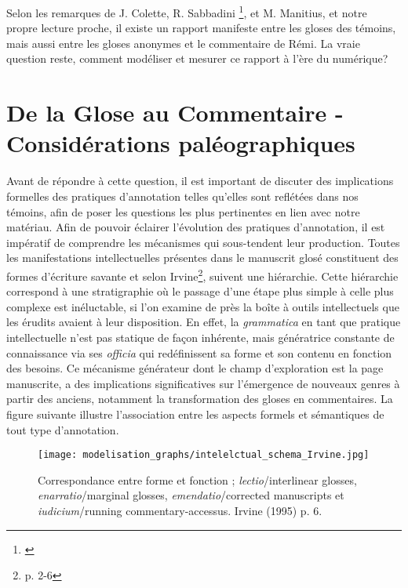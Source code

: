 \documentclass[a4paper, twoside, 12pt]{book}
\begin{document}
Selon les remarques de J. Colette, R. Sabbadini \footnote{\cite{sabbadini1995opere}}, et M. Manitius, et notre propre lecture proche, il existe un rapport manifeste entre les gloses des témoins, mais aussi entre les gloses anonymes et le commentaire de Rémi. La vraie question reste, comment modéliser et mesurer ce rapport à l'ère du numérique?\\


\section{De la Glose au Commentaire - Considérations paléographiques}

Avant de répondre à cette question, il est important de discuter des implications formelles des pratiques d'annotation telles qu'elles sont reflétées dans nos témoins, afin de poser les questions les plus pertinentes en lien avec notre matériau. Afin de pouvoir éclairer l'évolution des pratiques d'annotation, il est impératif de comprendre les mécanismes qui sous-tendent leur production. Toutes les manifestations intellectuelles présentes dans le manuscrit glosé constituent des \og{}formes d'écriture savante\fg{} et selon Irvine\footnote{\cite{irvine1994making}p. 2-6}, suivent une hiérarchie. Cette hiérarchie correspond à une stratigraphie où le passage d'une étape plus simple à celle plus complexe est inéluctable, si l'on examine de près la \og{}boîte à outils intellectuels\fg{} que les érudits avaient à leur disposition. En effet, la \textit{grammatica} en tant que pratique intellectuelle n'est pas statique de façon inhérente, mais génératrice constante  de connaissance via ses \textit{officia} qui redéfinissent sa forme et son contenu en fonction des besoins. Ce mécanisme générateur dont le champ d'exploration est la page manuscrite, a des implications significatives sur l'émergence de nouveaux genres à partir des anciens, notamment la transformation des gloses en commentaires. La figure suivante illustre l'association entre les aspects formels et sémantiques de tout type d'annotation.\\

\begin{figure}[H]
    \centering
    \texttt{[image: modelisation\_graphs/intelelctual\_schema\_Irvine.jpg]}
    \caption{Correspondance entre forme et fonction ; \textit{lectio}/interlinear glosses, \textit{enarratio}/marginal glosses, \textit{emendatio}/corrected manuscripts et \textit{iudicium}/running commentary-accessus. Irvine (1995) p. 6.}
    \label{fig:niveauxirvine}
\end{figure}
\end{document}
